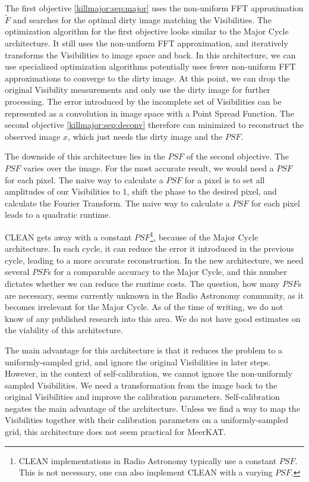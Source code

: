 The first objective \eqref{killmajor:sep:major} uses the non-uniform FFT approximation $\tilde{F}$ and searches for the optimal dirty image matching the Visibilities. The optimization algorithm for the first objective looks similar to the Major Cycle architecture. It still uses the non-uniform FFT approximation, and iteratively transforms the Visibilities to image space and back. In this architecture, we can use specialized optimization algorithms potentially uses fewer non-uniform FFT approximations to converge to the dirty image. At this point, we can drop the original Visibility measurements and only use the dirty image for further processing. The error introduced by the incomplete set of Visibilities can be represented as a convolution in image space with a Point Spread Function. The second objective \eqref{killmajor:sep:deconv} therefore can minimized to reconstruct the observed image $x$, which just needs the dirty image and the $PSF$.

The downside of this architecture lies in the $PSF$ of the second objective. The $PSF$ varies over the image. For the most accurate result, we would need a $PSF$ for each pixel. The naive way to calculate a $PSF$ for a pixel is to set all amplitudes of our Visibilities to 1, shift the phase to the desired pixel, and calculate the Fourier Transform. The naive way to calculate a $PSF$ for each pixel leads to a quadratic runtime.

CLEAN gets away with a constant $PSF$\footnote{CLEAN implementations in Radio Astronomy typically use a constant $PSF$. This is not necessary, one can also implement CLEAN with a varying $PSF$.}, because of the Major Cycle architecture. In each cycle, it can reduce the error it introduced in the previous cycle, leading to a more accurate reconstruction. In the new architecture, we need several $PSF$s for a comparable accuracy to the Major Cycle, and this number dictates whether we can reduce the runtime costs. The question, how many $PSF$s are necessary, seems currently unknown in the Radio Astronomy community, as it becomes irrelevant for the Major Cycle. As of the time of writing, we do not know of any published research into this area. We do not have good estimates on the viability of this architecture.

The main advantage for this architecture is that it reduces the problem to a uniformly-sampled grid, and ignore the original Visibilities in later steps. However, in the context of self-calibration, we cannot ignore the non-uniformly sampled Visibilities. We need a transformation from the image back to the original Visibilities and improve the calibration parameters. Self-calibration negates the main advantage of the architecture. Unless we find a way to map the Visibilities together with their calibration parameters on a uniformly-sampled grid, this architecture does not seem practical for MeerKAT.


